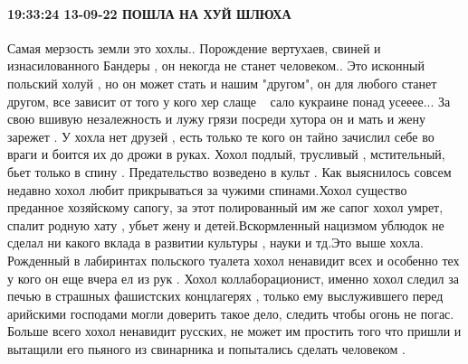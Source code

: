  
 
 
 
 

\paragraph{19:33:24 13-09-22 ПОШЛА НА ХУЙ ШЛЮХА}

Самая мерзость земли это хохлы.. Порождение вертухаев, свиней и изнасилованного
Бандеры , он некогда не станет человеком.. Это исконный польский холуй , но он
может стать и нашим "другом", он для любого станет другом, все зависит от того
у кого хер слаще🤢🤢🤢🤢сало кукраине понад усееее... За свою вшивую
незалежность и лужу грязи посреди хутора он и мать и жену зарежет . У хохла нет
друзей , есть только те кого он тайно зачислил себе во враги и боится их до
дрожи в руках. Хохол подлый, трусливый , мстительный, бьет только в спину .
Предательство возведено в культ . Как выяснилось совсем недавно хохол любит
прикрываться за чужими спинами.Хохол существо преданное хозяйскому сапогу, за
этот полированный им же сапог хохол умрет, спалит родную хату , убьет жену и
детей.Вскормленный нацизмом ублюдок не сделал ни какого вклада в развитии
культуры , науки и тд.Это выше хохла. Рожденный в лабиринтах польского туалета
хохол ненавидит всех и особенно тех у кого он еще вчера ел из рук . Хохол
коллаборационист, именно хохол следил за печью в страшных фашистских
концлагерях , только ему выслужившего перед арийскими господами могли доверить
такое дело, следить чтобы огонь не погас. Больше всего хохол ненавидит русских,
не может им простить того что пришли и вытащили его пьяного из свинарника и
попытались сделать человеком .
